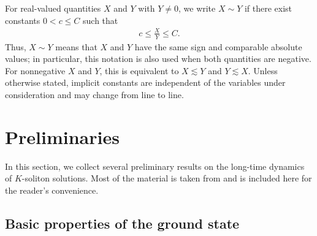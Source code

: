 \documentclass[10pt,a4paper]{amsart}
\numberwithin{equation}{section}
\begin{document}
For real-valued quantities $X$ and $Y$ with $Y\neq0$, we write $X\sim Y$ if there exist constants $0<c\leq C$ such that
\begin{align}\label{signedcomparison}
c\leq\frac{X}{Y}\leq C.
\end{align}
Thus, $X\sim Y$ means that $X$ and $Y$ have the same sign and comparable absolute values; in particular, this notation is also used when both quantities are negative. For nonnegative $X$ and $Y$, this
is equivalent to $X\lesssim Y$ and $Y\lesssim X$. Unless otherwise stated, implicit constants are independent of the variables under consideration and may change from line to line.











\section{Preliminaries}
In this section, we collect several preliminary results on the long-time dynamics of $K$-soliton solutions. Most of the material is taken from \cite[Section 2 and Section 3]{I2} and is included here for the reader's
convenience.

\subsection{Basic properties of the ground state}
\end{document}
